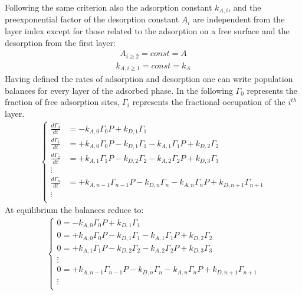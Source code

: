 \documentclass[letterpaper,10pt,english]{jupyterBook}
\begin{document}
\sphinxAtStartPar
Following the same criterion also the adsorption constant \(k_{A,i}\), and the pre\sphinxhyphen{}exponential factor of the desorption constant \(A_i\) are independent from the layer index \sphinxhyphen{} except for those related to the adsorption on a free surface and the desorption from the first layer:
\begin{equation}\label{equation:BET_isotherm:BETeq3}
\begin{split}
A_{i\geq2}=const=A
\end{split}
\end{equation}\begin{equation}\label{equation:BET_isotherm:BETeq4}
\begin{split}
k_{A,i\geq1}=const=k_A
\end{split}
\end{equation}
\sphinxAtStartPar
Having defined the rates of adsorption and desorption one can write population balances for every layer of the adsorbed phase.
In the following \(\Gamma_0\) represents the fraction of free adsorption sites, \(\Gamma_i\) represents the fractional occupation of the \(i^{th}\) layer.
\begin{equation}\label{equation:BET_isotherm:BETeq5}
\begin{split}
\begin{cases}
 \frac{d\Gamma_0}{dt}&=-k_{A,0}\Gamma_0P +k_{D,1}\Gamma_1 \\
 \frac{d\Gamma_1}{dt}&=+k_{A,0}\Gamma_0P -k_{D,1}\Gamma_1-k_{A,1}\Gamma_1P+k_{D,2}\Gamma_2 \\
 \frac{d\Gamma_2}{dt}&=+k_{A,1}\Gamma_1P -k_{D,2}\Gamma_2-k_{A,2}\Gamma_2P+k_{D,3}\Gamma_3 \\
 \vdots \\
 \frac{d\Gamma_n}{dt}&=+k_{A,n-1}\Gamma_{n-1}P -k_{D,n}\Gamma_n-k_{A,n}\Gamma_nP+k_{D,n+1}\Gamma_{n+1} \\
 \vdots\\
 \end{cases}
\end{split}
\end{equation}
\sphinxAtStartPar
At equilibrium the balances reduce to:
\begin{equation}\label{equation:BET_isotherm:BETeq6}
\begin{split}
\begin{cases}
 0=-k_{A,0}\Gamma_0P +k_{D,1}\Gamma_1 \\
 0=+k_{A,0}\Gamma_0P -k_{D,1}\Gamma_1-k_{A,1}\Gamma_1P+k_{D,2}\Gamma_2 \\
 0=+k_{A,1}\Gamma_1P -k_{D,2}\Gamma_2-k_{A,2}\Gamma_2P+k_{D,3}\Gamma_3 \\
 \vdots \\
 0=+k_{A,n-1}\Gamma_{n-1}P -k_{D,n}\Gamma_n-k_{A,n}\Gamma_nP+k_{D,n+1}\Gamma_{n+1} \\
 \vdots\\
 \end{cases}
\end{split}
\end{equation}
\end{document}
